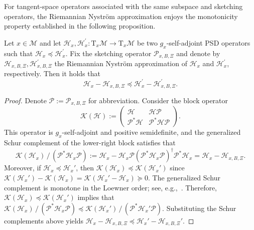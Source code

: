 \documentclass[final,onefignum,onetabnum]{siamart250211}
\begin{document}
  For tangent-space operators associated with the same subspace and sketching operators, the Riemannian Nystr\"om approximation enjoys the monotonicity property established in the following proposition.

  \begin{proposition}
    \label{prop: monotone}
    Let $x \in \mathcal{M}$ and let $\mathcal{H}_x,\mathcal{H}_x^\prime : \mathrm{T}_x\mathcal{M} \to \mathrm{T}_x\mathcal{M}$ be two $g_x$-self-adjoint PSD operators such that
    $
    \mathcal{H}_x\preceq \mathcal{H}_x^\prime.
    $
    Fix the sketching operator $\mathcal{P}_{x, B, \Xi}$ and denote by $\mathcal{H}_{x, B, \Xi}, \mathcal{H}_{x, B, \Xi}^\prime$ the Riemannian Nystr\"om approximation of $\mathcal{H}_x$ and $\mathcal{H}_x^\prime$, respectively. Then it holds that
    \[
    \mathcal{H}_x - \mathcal{H}_{x, B, \Xi} \preceq \mathcal{H}_x^\prime - \mathcal{H}_{x, B, \Xi}^\prime.
    \]
    \end{proposition}

    \begin{proof}
      Denote
      $\mathcal P := \mathcal{P}_{x,B,\Xi}$ for abbreviation.
      Consider the block operator
      \[
      \mathcal K(\mathcal{H})
      :=
      \begin{pmatrix}
      \mathcal{H} & \mathcal{H}\mathcal P\\
      \mathcal P^{*} \mathcal{H} & \mathcal P^{*} \mathcal{H}\mathcal P
      \end{pmatrix}.
      \]
      This operator is $g_x$-self-adjoint and positive semidefinite, and 
    the generalized Schur complement of the lower-right block satisfies that
      \[
      \mathcal K(\mathcal{H}_x)\,/\,(\mathcal P^{*}\mathcal{H}_x\mathcal P) := \mathcal{H}_x - \mathcal{H}_x \mathcal{P} (\mathcal{P}^* \mathcal{H}_x \mathcal{P})^\dagger \mathcal{P}^* \mathcal{H}_x = \mathcal{H}_x-\mathcal{H}_{x,B,\Xi}.
      \]
      Moreover, if $\mathcal{H}_x\preceq \mathcal{H}_x'$, then $\mathcal K(\mathcal{H}_x)\preceq \mathcal K(\mathcal{H}_x')$ since
      $
      \mathcal K(\mathcal{H}_x')-\mathcal K(\mathcal{H}_x)=\mathcal K(\mathcal{H}_x'-\mathcal{H}_x)\succeq 0.
      $
      The generalized Schur complement is monotone in the Loewner order; see, e.g.,~\cite{Ando1979GeneralizedSchur,AndersonTrapp1975ShortedII}. Therefore,
      $
      \mathcal K(\mathcal{H}_x)\preceq \mathcal K(\mathcal{H}_x')
      $ implies that
      $
      \mathcal K(\mathcal{H}_x)\,/\,(\mathcal P^{*}\mathcal{H}_x\mathcal P)
      \preceq
      \mathcal K(\mathcal{H}_x')\,/\,(\mathcal P^{*}\mathcal{H}_x'\mathcal P).
      $
      Substituting the Schur complements above yields
      $\mathcal{H}_x-\mathcal{H}_{x,B,\Xi}\preceq \mathcal{H}_x'-\mathcal{H}_{x,B,\Xi}'$.
      \end{proof}
    
\end{document}
